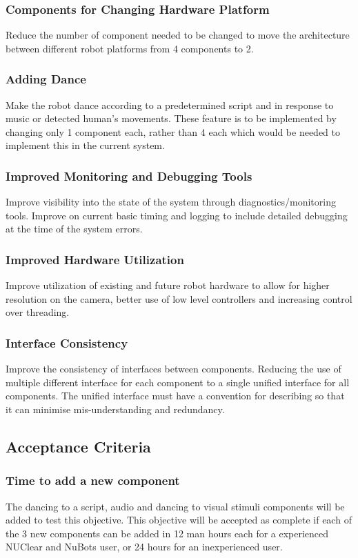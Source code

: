 \documentclass[a4paper]{article}
\begin{document}
			\subsubsection{Components for Changing Hardware Platform}
				Reduce the number of component needed to be changed to move the architecture between different robot platforms from 4 components to 2.
			\subsubsection{Adding Dance}
				Make the robot dance according to a predetermined script and in response to music or detected human’s movements. These feature is to be implemented by changing only 1 component each, rather than 4 each which would be needed to implement this in the current system. 

			\subsubsection{Improved Monitoring and Debugging Tools}
				 Improve visibility into the state of the system through diagnostics/monitoring tools. Improve on current basic timing and logging to include detailed debugging at the time of the system errors.
			\subsubsection{Improved Hardware Utilization}
				 Improve utilization of existing and future robot hardware to allow for higher resolution on the camera, better use of low level controllers and increasing control over threading.
			\subsubsection{Interface Consistency}
				 Improve the consistency of interfaces between components. Reducing the use of multiple different interface for each component to a single unified interface for all components. The unified interface must have a convention for describing so that it can minimise mis-understanding and redundancy.
				
		\subsection {Acceptance Criteria}
			\subsubsection{Time to add a new component}
				The dancing to a script, audio and dancing to visual stimuli components will be added to test this objective. This objective will be accepted as complete if each of the 3 new components can be added in 12 man hours each for a experienced NUClear and NuBots user, or 24 hours for an inexperienced user.
\end{document}
